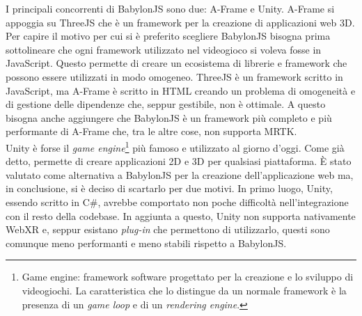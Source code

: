 I principali concorrenti di BabylonJS sono due: A-Frame e Unity. A-Frame si appoggia su ThreeJS che è un framework per la creazione di applicazioni web 3D. Per capire il motivo per
cui si è preferito scegliere BabylonJS bisogna prima sottolineare che ogni framework utilizzato nel videogioco si voleva fosse in JavaScript. Questo permette di creare un ecosistema
di librerie e framework che possono essere utilizzati in modo omogeneo. ThreeJS è un framework scritto in JavaScript, ma A-Frame è scritto in HTML creando un problema di omogeneità
e di gestione delle dipendenze che, seppur gestibile, non è ottimale. A questo bisogna anche aggiungere che BabylonJS è un framework più completo e più performante di A-Frame che,
tra le altre cose, non supporta MRTK.\\
Unity è forse il \textit{game engine}\footnote{
    Game engine: framework software progettato per la creazione e lo sviluppo di videogiochi. La caratteristica che lo distingue da un normale framework è la presenza di un
    \textit{game loop} e di un \textit{rendering engine}.
} più famoso e utilizzato al giorno d'oggi. Come già detto, permette di creare applicazioni 2D e 3D per qualsiasi piattaforma. È stato valutato come
alternativa a BabylonJS per la creazione dell'applicazione web ma, in conclusione, si è deciso di scartarlo per due motivi. In primo luogo, Unity, essendo scritto in C\#, avrebbe
comportato non poche difficoltà nell'integrazione con il resto della codebase. In aggiunta a questo, Unity non supporta nativamente WebXR e, seppur esistano \textit{plug-in} che permettono
di utilizzarlo, questi sono comunque meno performanti e meno stabili rispetto a BabylonJS.\\

